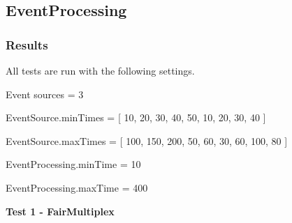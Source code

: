 \subsection{EventProcessing}

\subsubsection*{Results}

All tests are run with the following settings.

Event sources = 3

EventSource.minTimes = [ 10, 20, 30, 40, 50, 10, 20, 30, 40 ]

EventSource.maxTimes = [ 100, 150, 200, 50, 60, 30, 60, 100, 80 ]

EventProcessing.minTime = 10

EventProcessing.maxTime = 400

\textbf{Test 1 - FairMultiplex}


